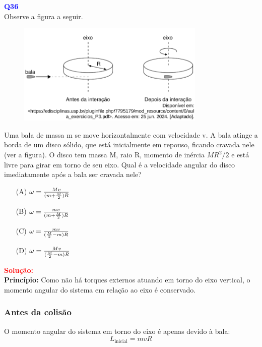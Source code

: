 \documentclass[a4paper,12pt]{article}
\begin{document}
\begin{flushleft}
\textbf{\textcolor{blue}{\Large Q36 }}\\
\noindent
Observe a figura a seguir.

\begin{figure}[h]
\centering
\includegraphics[width=0.8\textwidth]{figures/momento_angular.png}
\end{figure}

Uma bala de massa m se move horizontalmente com
velocidade v. A bala atinge a borda de um disco sólido, que
está inicialmente em repouso, ficando cravada nele (ver a
figura). O disco tem massa M, raio R, momento de inércia
$MR^{2}/2$ e está livre para girar em torno de seu eixo. Qual é a
velocidade angular do disco imediatamente após a bala ser
cravada nele?

\begin{itemize}
\item[(A)] $\Huge \omega = \frac{Mv}{(m+\frac{M}{2})R}$
\item[(B)] $\Huge \omega = \frac{mv}{(m+\frac{M}{2})R}$
\item[(C)] $\Huge \omega = \frac{mv}{(\frac{M}{2}-m)R}$
\item[(D)] $\Huge \omega = \frac{Mv}{(\frac{M}{2}-m)R}$
\end{itemize}

\vspace{0.5cm}

\textcolor{red}{\textbf{Solução:}}\\

\textbf{Princípio:}  
Como não há torques externos atuando em torno do eixo vertical, o momento angular do sistema em relação ao eixo é conservado.

\subsubsection*{Antes da colisão}
O momento angular do sistema em torno do eixo é apenas devido à bala:
\[
L_{\text{inicial}} = m v R
\]


\end{flushleft}
\end{document}

